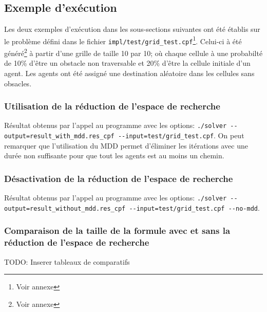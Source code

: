 \documentclass[french, 10pt, letterpaper]{article}
\theoremstyle{definition}
\theoremstyle{proposition}
\theoremstyle{example}
\begin{document}
    

    \subsection{Exemple d'exécution}
    \label{sec:example}

    Les deux exemples d'exécution dans les sous-sections suivantes ont été établis sur le problème défini dans le fichier
    \lstinline{impl/test/grid_test.cpf}\footnote{Voir annexe }. Celui-ci à été généré\footnote{Voir annexe } à partir d'une grille de taille 10 par 10;
    où chaque cellule à une probabilté de 10\% d'être un obstacle non traversable et 20\% d'être la cellule initiale d'un agent.
    Les agents ont été assigné une destination aléatoire dans les cellules sans obsacles.

    \subsubsection{Utilisation de la réduction de l'espace de recherche}

    Résultat obtenus par l'appel au programme avec les options: \lstinline{./solver --output=result_with_mdd.res_cpf --input=test/grid_test.cpf}.
    On peut remarquer que l'utilisation du MDD permet d'éliminer les itérations avec une durée non suffisante pour que tout les agents est  au moins un chemin.

    

    \subsubsection{Désactivation de la réduction de l'espace de recherche}

    Résultat obtenus par l'appel au programme avec les options: \lstinline{./solver --output=result_without_mdd.res_cpf --input=test/grid_test.cpf --no-mdd}.

    

    \subsubsection{Comparaison de la taille de la formule avec et sans la réduction de l'espace de recherche}
    \label{sec:compartaille}
    
    TODO: Inserer tableaux de comparatifs
\end{document}
